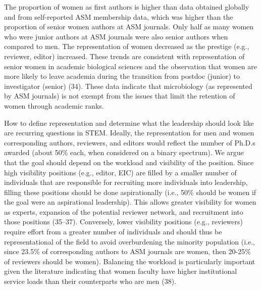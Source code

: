 \documentclass[11pt,]{article}
\begin{document}
The proportion of women as first authors is higher than data obtained
globally and from self-reported ASM membership data, which was higher
than the proportion of senior women authors at ASM journals. Only half
as many women who were junior authors at ASM journals were also senior
authors when compared to men. The representation of women decreased as
the prestige (e.g., reviewer, editor) increased. These trends are
consistent with representation of senior women in academic biological
sciences and the observation that women are more likely to leave
academia during the transition from postdoc (junior) to investigator
(senior) (34). These data indicate that microbiology (as represented by
ASM journals) is not exempt from the issues that limit the retention of
women through academic ranks.

How to define representation and determine what the leadership should
look like are recurring questions in STEM. Ideally, the representation
for men and women corresponding authors, reviewers, and editors would
reflect the number of Ph.D.s awarded (about 50\% each, when considered
on a binary spectrum). We argue that the goal should depend on the
workload and visibility of the position. Since high visibility positions
(e.g., editor, EIC) are filled by a smaller number of individuals that
are responsible for recruiting more individuals into leadership, filling
these positions should be done aspirationally (i.e., 50\% should be
women if the goal were an aspirational leadership). This allows greater
visibility for women as experts, expansion of the potential reviewer
network, and recruitment into those positions (35--37). Conversely,
lower visibility positions (e.g., reviewers) require effort from a
greater number of individuals and should thus be representational of the
field to avoid overburdening the minority population (i.e., since 23.5\%
of corresponding authors to ASM journals are women, then 20-25\% of
reviewers should be women). Balancing the workload is particularly
important given the literature indicating that women faculty have higher
institutional service loads than their counterparts who are men (38).
\end{document}
